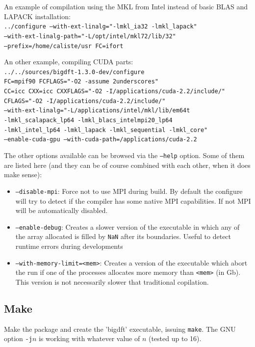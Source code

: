 \documentclass[a4paper,11pt]{report}
\begin{document}
An example of compilation using the MKL from Intel instead of basic BLAS and LAPACK installation:\\
\texttt{../configure --with-ext-linalg="-lmkl\_ia32 -lmkl\_lapack"\\
   --with-ext-linalg-path="-L/opt/intel/mkl72/lib/32"\\
   --prefix=/home/caliste/usr FC=ifort}

\smallskip

An other example, compiling CUDA parts:\\
\texttt{../../sources/bigdft-1.3.0-dev/configure\\
  FC=mpif90 FCFLAGS="-O2  -assume 2underscores"\\
  CC=icc CXX=icc CXXFLAGS="-O2  -I/applications/cuda-2.2/include/"\\
  CFLAGS="-O2  -I/applications/cuda-2.2/include/"\\
  --with-ext-linalg="-L/applications/intel/mkl/lib/em64t\\
                     -lmkl\_scalapack\_lp64 -lmkl\_blacs\_intelmpi20\_lp64\\
                     -lmkl\_intel\_lp64 -lmkl\_lapack -lmkl\_sequential -lmkl\_core"\\
  --enable-cuda-gpu --with-cuda-path=/applications/cuda-2.2}

The other options available can be browsed via the \texttt{--help} option.
Some of them are listed here (and they can be of course combined with each other, when it does make sense):
\begin{itemize}
  \item \texttt{--disable-mpi}: Force not to use MPI during build. By default the configure will try to detect if the compiler has some native MPI capabilities. If not MPI will be automatically disabled.
\item \texttt{--enable-debug}: Creates a slower version of the executable in which any of the array allocated is filled by \texttt{NaN} after its boundaries. Useful to detect runtime errors during developments
\item \texttt{--with-memory-limit=<mem>}: Creates a version of the executable which abort the run if one of the processes allocates more memory than \texttt{<mem>} (in Gb). This version is not necessarily slower that traditional copilation.
\end{itemize}


\subsection{Make}
Make the package and create the 'bigdft' executable, issuing \texttt{make}. The GNU option \texttt{-j$n$} is working with whatever value of $n$ (tested up to 16).
\end{document}
